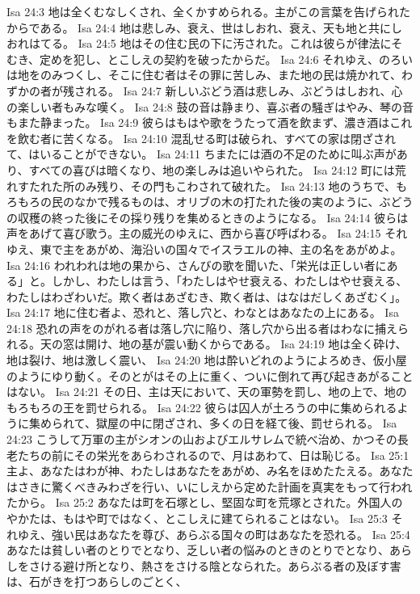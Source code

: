 Isa 24:3  地は全くむなしくされ、全くかすめられる。主がこの言葉を告げられたからである。
Isa 24:4  地は悲しみ、衰え、世はしおれ、衰え、天も地と共にしおれはてる。
Isa 24:5  地はその住む民の下に汚された。これは彼らが律法にそむき、定めを犯し、とこしえの契約を破ったからだ。
Isa 24:6  それゆえ、のろいは地をのみつくし、そこに住む者はその罪に苦しみ、また地の民は焼かれて、わずかの者が残される。
Isa 24:7  新しいぶどう酒は悲しみ、ぶどうはしおれ、心の楽しい者もみな嘆く。
Isa 24:8  鼓の音は静まり、喜ぶ者の騒ぎはやみ、琴の音もまた静まった。
Isa 24:9  彼らはもはや歌をうたって酒を飲まず、濃き酒はこれを飲む者に苦くなる。
Isa 24:10  混乱せる町は破られ、すべての家は閉ざされて、はいることができない。
Isa 24:11  ちまたには酒の不足のために叫ぶ声があり、すべての喜びは暗くなり、地の楽しみは追いやられた。
Isa 24:12  町には荒れすたれた所のみ残り、その門もこわされて破れた。
Isa 24:13  地のうちで、もろもろの民のなかで残るものは、オリブの木の打たれた後の実のように、ぶどうの収穫の終った後にその採り残りを集めるときのようになる。
Isa 24:14  彼らは声をあげて喜び歌う。主の威光のゆえに、西から喜び呼ばわる。
Isa 24:15  それゆえ、東で主をあがめ、海沿いの国々でイスラエルの神、主の名をあがめよ。
Isa 24:16  われわれは地の果から、さんびの歌を聞いた、「栄光は正しい者にある」と。しかし、わたしは言う、「わたしはやせ衰える、わたしはやせ衰える、わたしはわざわいだ。欺く者はあざむき、欺く者は、はなはだしくあざむく」。
Isa 24:17  地に住む者よ、恐れと、落し穴と、わなとはあなたの上にある。
Isa 24:18  恐れの声をのがれる者は落し穴に陥り、落し穴から出る者はわなに捕えられる。天の窓は開け、地の基が震い動くからである。
Isa 24:19  地は全く砕け、地は裂け、地は激しく震い、
Isa 24:20  地は酔いどれのようによろめき、仮小屋のようにゆり動く。そのとがはその上に重く、ついに倒れて再び起きあがることはない。
Isa 24:21  その日、主は天において、天の軍勢を罰し、地の上で、地のもろもろの王を罰せられる。
Isa 24:22  彼らは囚人が土ろうの中に集められるように集められて、獄屋の中に閉ざされ、多くの日を経て後、罰せられる。
Isa 24:23  こうして万軍の主がシオンの山およびエルサレムで統べ治め、かつその長老たちの前にその栄光をあらわされるので、月はあわて、日は恥じる。
Isa 25:1  主よ、あなたはわが神、わたしはあなたをあがめ、み名をほめたたえる。あなたはさきに驚くべきみわざを行い、いにしえから定めた計画を真実をもって行われたから。
Isa 25:2  あなたは町を石塚とし、堅固な町を荒塚とされた。外国人のやかたは、もはや町ではなく、とこしえに建てられることはない。
Isa 25:3  それゆえ、強い民はあなたを尊び、あらぶる国々の町はあなたを恐れる。
Isa 25:4  あなたは貧しい者のとりでとなり、乏しい者の悩みのときのとりでとなり、あらしをさける避け所となり、熱さをさける陰となられた。あらぶる者の及ぼす害は、石がきを打つあらしのごとく、
